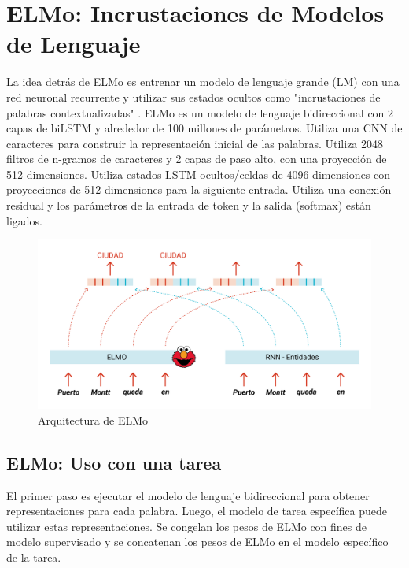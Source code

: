 \section{ELMo: Incrustaciones de Modelos de Lenguaje}

La idea detrás de ELMo es entrenar un modelo de lenguaje grande (LM) con una red neuronal recurrente y utilizar sus estados ocultos como "incrustaciones de palabras contextualizadas" \cite{peters-etal-2018-deep}. ELMo es un modelo de lenguaje bidireccional con 2 capas de biLSTM y alrededor de 100 millones de parámetros. Utiliza una CNN de caracteres para construir la representación inicial de las palabras. Utiliza 2048 filtros de n-gramos de caracteres y 2 capas de paso alto, con una proyección de 512 dimensiones. Utiliza estados LSTM ocultos/celdas de 4096 dimensiones con proyecciones de 512 dimensiones para la siguiente entrada. Utiliza una conexión residual y los parámetros de la entrada de token y la salida (softmax) están ligados.

\begin{figure}[h]
  \centering
  \includegraphics[scale=0.5]{pics/elmo.png}
  \caption{Arquitectura de ELMo}
\end{figure}

\subsection{ELMo: Uso con una tarea}

El primer paso es ejecutar el modelo de lenguaje bidireccional para obtener representaciones para cada palabra. Luego, el modelo de tarea específica puede utilizar estas representaciones. Se congelan los pesos de ELMo con fines de modelo supervisado y se concatenan los pesos de ELMo en el modelo específico de la tarea.

